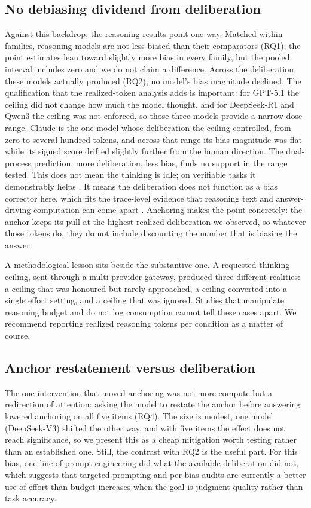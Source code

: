 \documentclass[conference]{IEEEtran}
\begin{document}
\subsection{No debiasing dividend from deliberation}
Against this backdrop, the reasoning results point one way. Matched within families, reasoning models are not less biased than their comparators (RQ1); the point estimates lean toward slightly more bias in every family, but the pooled interval includes zero and we do not claim a difference. Across the deliberation these models actually produced (RQ2), no model's bias magnitude declined. The qualification that the realized-token analysis adds is important: for GPT-5.1 the ceiling did not change how much the model thought, and for DeepSeek-R1 and Qwen3 the ceiling was not enforced, so those three models provide a narrow dose range. Claude is the one model whose deliberation the ceiling controlled, from zero to several hundred tokens, and across that range its bias magnitude was flat while its signed score drifted slightly further from the human direction. The dual-process prediction, more deliberation, less bias, finds no support in the range tested. This does not mean the thinking is idle; on verifiable tasks it demonstrably helps \cite{snell2024scaling}. It means the deliberation does not function as a bias corrector here, which fits the trace-level evidence that reasoning text and answer-driving computation can come apart \cite{turpin2023language, chen2025reasoning, shojaee2025illusion}. Anchoring makes the point concretely: the anchor keeps its pull at the highest realized deliberation we observed, so whatever those tokens do, they do not include discounting the number that is biasing the answer.

A methodological lesson sits beside the substantive one. A requested thinking ceiling, sent through a multi-provider gateway, produced three different realities: a ceiling that was honoured but rarely approached, a ceiling converted into a single effort setting, and a ceiling that was ignored. Studies that manipulate reasoning budget and do not log consumption cannot tell these cases apart. We recommend reporting realized reasoning tokens per condition as a matter of course.

\subsection{Anchor restatement versus deliberation}
The one intervention that moved anchoring was not more compute but a redirection of attention: asking the model to restate the anchor before answering lowered anchoring on all five items (RQ4). The size is modest, one model (DeepSeek-V3) shifted the other way, and with five items the effect does not reach significance, so we present this as a cheap mitigation worth testing rather than an established one. Still, the contrast with RQ2 is the useful part. For this bias, one line of prompt engineering did what the available deliberation did not, which suggests that targeted prompting and per-bias audits are currently a better use of effort than budget increases when the goal is judgment quality rather than task accuracy.
\end{document}
